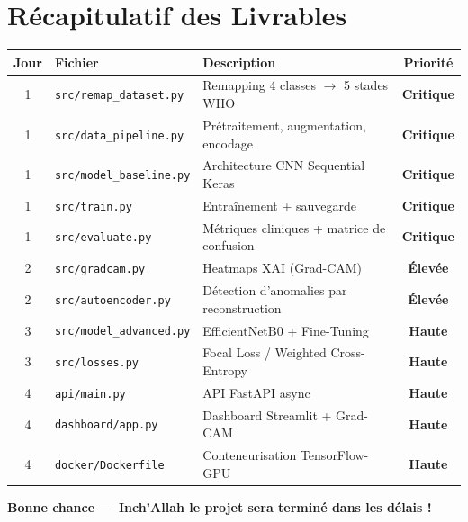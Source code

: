 \documentclass[12pt,a4paper]{article}
\begin{document}
\section{Récapitulatif des Livrables}

\begin{center}
\begin{tabularx}{\textwidth}{|c|l|X|c|}
\hline
\rowcolor{primaryBlue!20}
\textbf{Jour} & \textbf{Fichier} & \textbf{Description} & \textbf{Priorité} \\
\hline
1 & \texttt{src/remap\_dataset.py}   & Remapping 4 classes $\rightarrow$ 5 stades WHO  & \textcolor{dangerRed}{\textbf{Critique}} \\
1 & \texttt{src/data\_pipeline.py}   & Prétraitement, augmentation, encodage      & \textcolor{dangerRed}{\textbf{Critique}} \\
1 & \texttt{src/model\_baseline.py}  & Architecture CNN Sequential Keras          & \textcolor{dangerRed}{\textbf{Critique}} \\
1 & \texttt{src/train.py}            & Entraînement + sauvegarde                  & \textcolor{dangerRed}{\textbf{Critique}} \\
1 & \texttt{src/evaluate.py}         & Métriques cliniques + matrice de confusion & \textcolor{dangerRed}{\textbf{Critique}} \\
\hline
2 & \texttt{src/gradcam.py}          & Heatmaps XAI (Grad-CAM)                   & \textcolor{warningOrange}{\textbf{Élevée}} \\
2 & \texttt{src/autoencoder.py}      & Détection d'anomalies par reconstruction  & \textcolor{warningOrange}{\textbf{Élevée}} \\
\hline
3 & \texttt{src/model\_advanced.py}  & EfficientNetB0 + Fine-Tuning               & \textcolor{accentGreen}{\textbf{Haute}} \\
3 & \texttt{src/losses.py}           & Focal Loss / Weighted Cross-Entropy        & \textcolor{accentGreen}{\textbf{Haute}} \\
\hline
4 & \texttt{api/main.py}             & API FastAPI async                          & \textcolor{accentGreen}{\textbf{Haute}} \\
4 & \texttt{dashboard/app.py}        & Dashboard Streamlit + Grad-CAM             & \textcolor{accentGreen}{\textbf{Haute}} \\
4 & \texttt{docker/Dockerfile}       & Conteneurisation TensorFlow-GPU            & \textcolor{accentGreen}{\textbf{Haute}} \\
\hline
\end{tabularx}
\end{center}

\vspace{1cm}
\begin{center}
\textcolor{primaryBlue}{\large\textbf{Bonne chance — Inch'Allah le projet sera terminé dans les délais ! \faRocket}}
\end{center}
\end{document}
